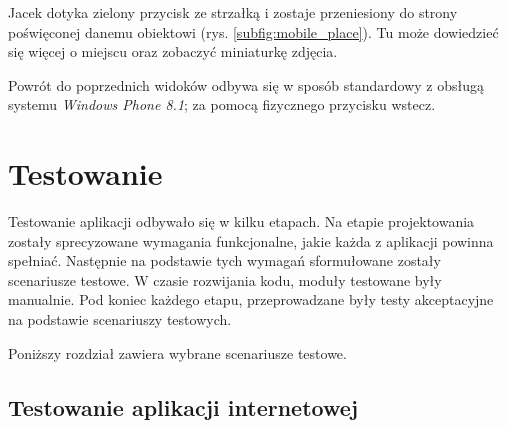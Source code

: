 \documentclass[a4paper]{book}
\begin{document}
		Jacek dotyka zielony przycisk ze strzałką i zostaje przeniesiony do strony poświęconej danemu obiektowi (rys. \ref{subfig:mobile_place}). Tu może dowiedzieć się więcej o miejscu oraz zobaczyć miniaturkę zdjęcia.
		
		Powrót do poprzednich widoków odbywa się w sposób standardowy z obsługą systemu \emph{Windows Phone 8.1}; za pomocą fizycznego przycisku wstecz. 		 
	
	\chapter{Testowanie}

	\label{id:cha:testowanie}
	
	Testowanie aplikacji odbywało się w kilku etapach. Na etapie projektowania zostały sprecyzowane wymagania funkcjonalne, jakie każda z aplikacji powinna spełniać. Następnie na podstawie tych wymagań sformułowane zostały scenariusze testowe. W czasie rozwijania kodu, moduły testowane były manualnie. Pod koniec każdego etapu, przeprowadzane były testy akceptacyjne na podstawie scenariuszy testowych. 
	
	Poniższy rozdział zawiera wybrane scenariusze testowe.
	
	\setlength{\tabcolsep}{6pt}
	\renewcommand{\arraystretch}{1.5}
		
		\section{Testowanie aplikacji internetowej}		
\end{document}
